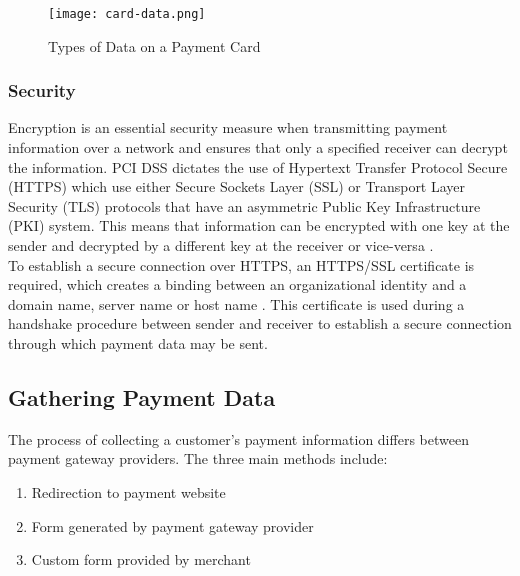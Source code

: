 \begin{figure}[!hbt]
  	\centering
 	\texttt{[image: card-data.png]}
  	\caption{Types of Data on a Payment Card\cite{card-data}}
 	\label{fig:card-data}
\end{figure}

\subsubsection{Security}
\label{subsec:security}

Encryption is an essential security measure when transmitting payment information over a network and ensures that only a specified receiver can decrypt the information. PCI DSS dictates the use of Hypertext Transfer Protocol Secure (HTTPS) which use either Secure Sockets Layer (SSL) or Transport Layer Security (TLS) protocols that have an asymmetric Public Key Infrastructure (PKI) system. This means that information can be encrypted with one key at the sender and decrypted by a different key at the receiver or vice-versa \cite{comodo}.\\

To establish a secure connection over HTTPS, an HTTPS/SSL certificate is required, which creates a binding between an organizational identity and a domain name, server name or host name \cite{ssl-certificate}. This certificate is used during a handshake procedure between sender and receiver to establish a secure connection through which payment data may be sent.

\subsection{Gathering Payment Data}
\label{subsec:gathering-payment-data}

The process of collecting a customer's payment information differs between payment gateway providers. The three main methods include:

\begin{enumerate}
	\item Redirection to payment website
    \item Form generated by payment gateway provider
    \item Custom form provided by merchant
\end{enumerate}

